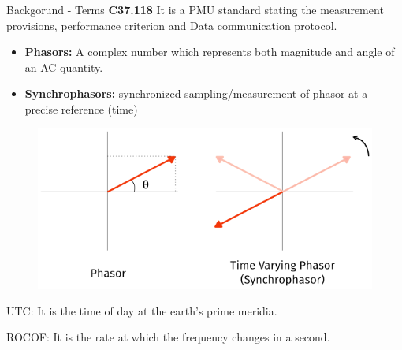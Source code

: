\documentclass{beamer}
\begin{document}
 
 
     \begin{frame}{Backgorund - Terms}
   	 \textbf{C37.118} It is a PMU standard stating the measurement provisions, performance criterion and Data communication protocol.
   	 \begin{center}
		\begin{itemize}
		\item \textbf{Phasors:} A complex number which represents both magnitude and angle of an AC quantity.
		\item \textbf{Synchrophasors:} synchronized sampling/measurement of phasor at a precise reference (time)
		\end{itemize}
		\begin{figure}
		\includegraphics*[scale=0.5]{Phasors.png}
		\end{figure}
		\item UTC: It is the time of day at the earth's prime meridia.
		\item ROCOF: It is the rate at which the frequency changes in a second.
		
   	 \end{center}
     \end{frame}
 
\end{document}
